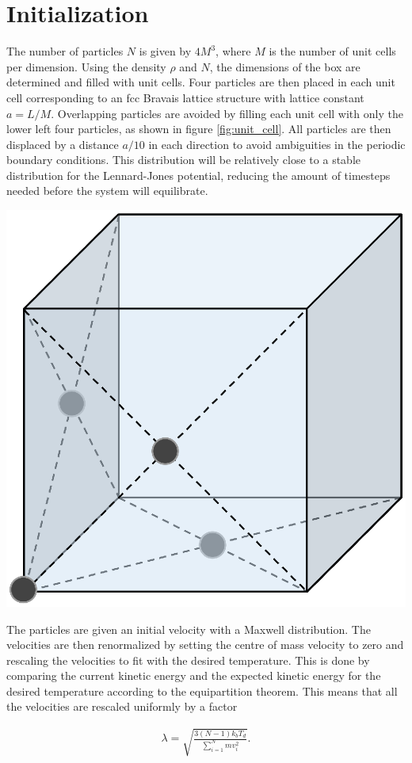 \section{Initialization}
The number of particles $N$ is given by $4M^3$, where $M$ is the number of unit cells per dimension. Using the density $\rho$ and $N$, the dimensions of the box are determined and filled with unit cells. Four particles are then placed in each unit cell corresponding to an fcc Bravais lattice structure with lattice constant $a=L/M$. Overlapping particles are avoided by filling each unit cell with only the lower left four particles, as shown in figure \ref{fig:unit_cell}. All particles are then displaced by a distance $a/10$ in each direction to avoid ambiguities in the periodic boundary conditions. This distribution will be relatively close to a stable distribution for the Lennard-Jones potential, reducing the amount of timesteps needed before the system will equilibrate.
\begin{Figure}
 \centering
 \includegraphics[width=0.35\linewidth]{fcc_cell.eps}
 \label{fig:unit_cell}
\end{Figure}

The particles are given an initial velocity with a Maxwell distribution\cite{jos}. The velocities are then renormalized by setting the centre of mass velocity to zero and rescaling the velocities to fit with the desired temperature. This is done by comparing the current kinetic energy and the expected kinetic energy for the desired temperature according to the equipartition theorem. This means that all the velocities are rescaled uniformly by a factor

\begin{gather*}
\lambda = \sqrt{\frac{3\left(N-1\right)k_bT_d}{\sum_{i=1}^Nmv_i^2}}.
\end{gather*}

